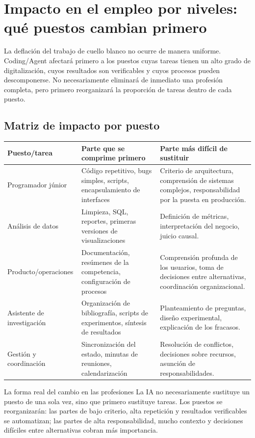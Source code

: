\section{Impacto en el empleo por niveles: qué puestos cambian primero}

La deflación del trabajo de cuello blanco no ocurre de manera uniforme. Coding/Agent afectará primero a los puestos cuyas tareas tienen un alto grado de digitalización, cuyos resultados son verificables y cuyos procesos pueden descomponerse. No necesariamente eliminará de inmediato una profesión completa, pero primero reorganizará la proporción de tareas dentro de cada puesto.

\subsection{Matriz de impacto por puesto}

\noindent\begin{longtable}{p{}p{}p{}}
\toprule
Puesto/tarea & Parte que se comprime primero & Parte más difícil de sustituir \\
\midrule
Programador júnior & Código repetitivo, bugs simples, scripts, encapsulamiento de interfaces & Criterio de arquitectura, comprensión de sistemas complejos, responsabilidad por la puesta en producción. \\
Análisis de datos & Limpieza, SQL, reportes, primeras versiones de visualizaciones & Definición de métricas, interpretación del negocio, juicio causal. \\
Producto/operaciones & Documentación, resúmenes de la competencia, configuración de procesos & Comprensión profunda de los usuarios, toma de decisiones entre alternativas, coordinación organizacional. \\
Asistente de investigación & Organización de bibliografía, scripts de experimentos, síntesis de resultados & Planteamiento de preguntas, diseño experimental, explicación de los fracasos. \\
Gestión y coordinación & Sincronización del estado, minutas de reuniones, calendarización & Resolución de conflictos, decisiones sobre recursos, asunción de responsabilidades. \\
\bottomrule
\end{longtable}

\begin{importantbox}{La forma real del cambio en las profesiones}
La IA no necesariamente sustituye un puesto de una sola vez, sino que primero sustituye tareas. Los puestos se reorganizarán: las partes de bajo criterio, alta repetición y resultados verificables se automatizan; las partes de alta responsabilidad, mucho contexto y decisiones difíciles entre alternativas cobran más importancia.
\end{importantbox}

